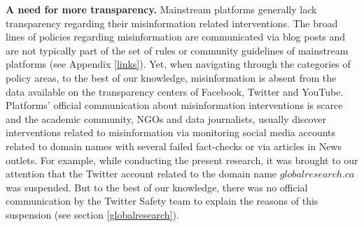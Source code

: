 \documentclass{article}
\begin{document}
\smallskip

{\bf A need for more transparency.} 
Mainstream platforms generally lack transparency regarding their misinformation related interventions.
The broad lines of policies regarding misinformation are communicated via blog posts and are not typically part of the set of rules or community guidelines of mainstream platforms (see Appendix \ref{links}).
Yet, when navigating through the categories of policy areas, to the best of our knowledge, misinformation is absent from the data available on the transparency centers of Facebook, Twitter and YouTube.
Platforms' official communication about misinformation interventions is scarce and the academic community, NGOs and data journalists, usually discover interventions related to misinformation via monitoring social media accounts related to domain names with several failed fact-checks or via articles in News outlets. 
For example, while conducting the present research, it was brought to our attention that the Twitter account related to the domain name $globalresearch.ca$ was suspended. 
But to the best of our knowledge, there was no official communication by the Twitter Safety team to explain the reasons of this suspension (see section \ref{globalresearch}). 
\end{document}
